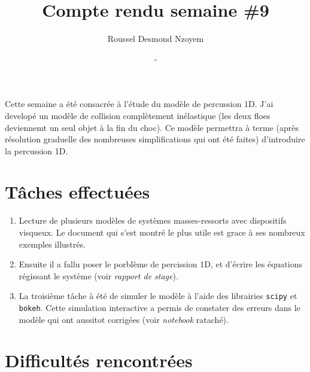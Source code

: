 \documentclass[
  french,
	11pt, %
]{fphw}
\title{Compte rendu semaine \#9} %
\author{Roussel Desmond Nzoyem} %
\date{\DTMdisplaydate{2021}{4}{31}{-1} - \DTMdisplaydate{2021}{4}{06}{-1}} %
\institute{Sorbonne Université \\ Laboratoire Jacques-Louis Lions} %
\begin{document}
\maketitle %



Cette semaine a été consacrée à l'étude du modèle de percussion 1D. J'ai developé un modèle de collision complètement inélastique (les deux floes deviennemt un seul objet à la fin du choc). Ce modèle permettra à terme (après résolution graduelle des nombreuses simplifications qui ont été faites) d'introduire la percussion 1D.





\section*{Tâches effectuées}

\begin{enumerate}
  \item Lecture de plusieurs modèles de systèmes masses-ressorts avec dispositifs visqueux. Le document qui s'est montré le plus utile est \parencite{homodeling} grace à ses nombreux exemples illustrés.
  \item Ensuite il a fallu poser le porblème de percission 1D, et d'écrire les équations régissant le système (voir \textit{rapport de stage}).
  \item La troisième tâche à été de simuler le modèle à l'aide des librairies \verb|scipy| et \verb|bokeh|. Cette simulation interactive a permis de constater des erreurs dans le modèle qui ont aussitot corrigées (voir \textit{notebook} rataché). 
\end{enumerate}



\section*{Difficultés rencontrées}
\end{document}

